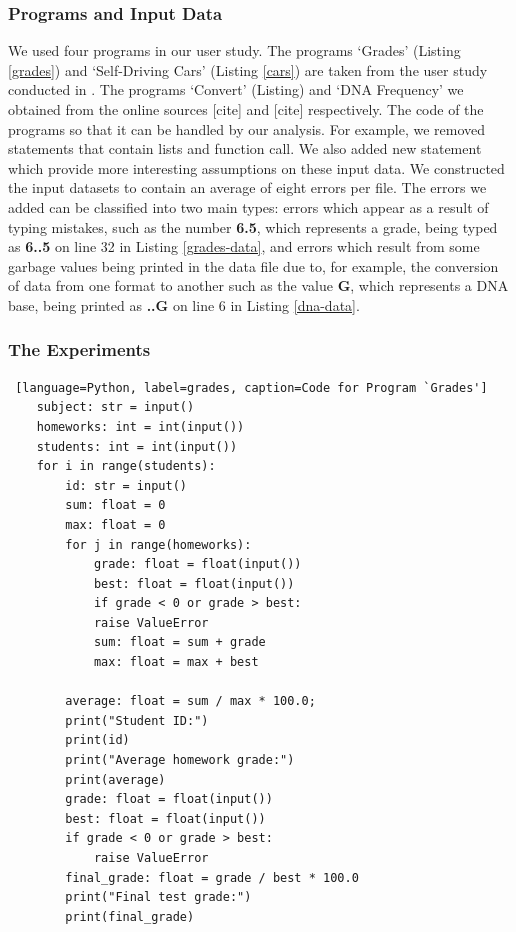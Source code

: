 \documentclass[10pt]{report}
\begin{document}
\subsubsection{Programs and Input Data}

We used four programs in our user study. The programs `Grades' (Listing \ref{grades}) and `Self-Driving Cars' (Listing \ref{cars}) are taken from the user study conducted in \cite{madelin}. The programs `Convert' (Listing) and `DNA Frequency' we obtained from the online sources [cite] and [cite] respectively. The code of the programs so that it can be handled by our analysis. For example, we removed statements that contain lists and function call. We also added new statement which provide more interesting assumptions on these input data. We constructed the input datasets to contain an average of eight errors per file. The errors we added can be classified into two main types: errors which appear as a result of typing mistakes, such as the number \textbf{6.5}, which represents a grade, being typed as \textbf{6..5} on line 32 in Listing \ref{grades-data}, and errors which result from some garbage values being printed in the data file due to, for example, the conversion of data from one format to another such as the value \textbf{G}, which represents a DNA base, being printed as \textbf{..G} on line 6 in Listing \ref{dna-data}.   \\ 

\subsubsection{The Experiments}

\begin{lstlisting} [language=Python, label=grades, caption=Code for Program `Grades']
	subject: str = input()
	homeworks: int = int(input())
	students: int = int(input())
	for i in range(students):
		id: str = input()
		sum: float = 0
		max: float = 0
		for j in range(homeworks):
			grade: float = float(input())
			best: float = float(input())
			if grade < 0 or grade > best:
			raise ValueError
			sum: float = sum + grade
			max: float = max + best
		
		average: float = sum / max * 100.0;
		print("Student ID:")
		print(id)
		print("Average homework grade:")
		print(average)
		grade: float = float(input())
		best: float = float(input())
		if grade < 0 or grade > best:
			raise ValueError
		final_grade: float = grade / best * 100.0
		print("Final test grade:")
		print(final_grade)
\end{lstlisting}
\end{document}
